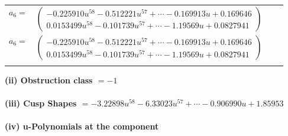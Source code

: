 \documentclass[1p]{elsarticle_modified}
\theoremstyle{definition}
\begin{document}
\begin{tabular}{m{7pt} m{180pt} m{7pt} m{180pt} }
\flushright $a_{6}=$&$\begin{pmatrix}-0.225910 u^{58}-0.512221 u^{57}+\cdots-0.169913 u+0.169646\\0.0153499 u^{58}-0.101739 u^{57}+\cdots-1.19569 u+0.0827941\end{pmatrix}$\\ \flushright $a_{6}=$&$\begin{pmatrix}-0.225910 u^{58}-0.512221 u^{57}+\cdots-0.169913 u+0.169646\\0.0153499 u^{58}-0.101739 u^{57}+\cdots-1.19569 u+0.0827941\end{pmatrix}$\\&\end{tabular}
\flushleft \textbf{(ii) Obstruction class $= -1$}\\~\\
\flushleft \textbf{(iii) Cusp Shapes $= -3.22898 u^{58}-6.33023 u^{57}+\cdots-0.906990 u+1.85953$}\\~\\
\newpage\renewcommand{\arraystretch}{1}
\flushleft \textbf{(iv) u-Polynomials at the component}\newline \\
\end{document}
